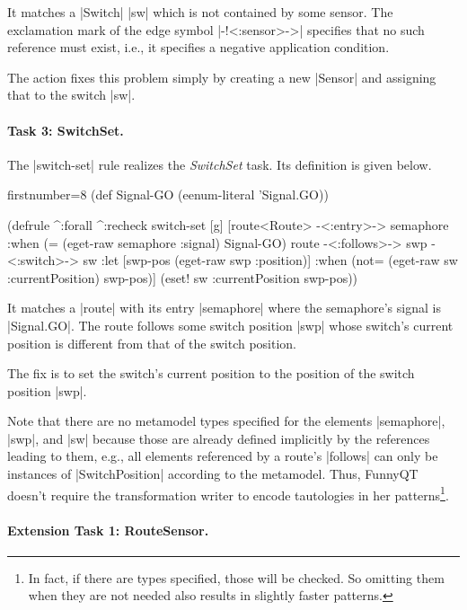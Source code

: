 \documentclass[submission]{eptcs}
\newcommand{\code}{\clojureinline}
\begin{document}
It matches a \code|Switch| \code|sw| which is not contained by some sensor.
The exclamation mark of the edge symbol \code|-!<:sensor>->| specifies that no
such reference must exist, i.e., it specifies a negative application condition.

The action fixes this problem simply by creating a new \code|Sensor| and
assigning that to the switch \code|sw|.


\paragraph{Task 3: SwitchSet.}

The \code|switch-set| rule realizes the \emph{SwitchSet} task.  Its definition
is given below.

\begin{clojurecode*}{firstnumber=8}
(def Signal-GO (eenum-literal 'Signal.GO))

(defrule ^:forall ^:recheck switch-set [g]
  [route<Route> -<:entry>-> semaphore
   :when (= (eget-raw semaphore :signal) Signal-GO)
   route -<:follows>-> swp -<:switch>-> sw
   :let [swp-pos (eget-raw swp :position)]
   :when (not= (eget-raw sw :currentPosition) swp-pos)]
  (eset! sw :currentPosition swp-pos))
\end{clojurecode*}

It matches a \code|route| with its entry \code|semaphore| where the semaphore's
signal is \code|Signal.GO|.  The route follows some switch position \code|swp|
whose switch's current position is different from that of the switch position.

The fix is to set the switch's current position to the position of the switch
position \code|swp|.

Note that there are no metamodel types specified for the elements
\code|semaphore|, \code|swp|, and \code|sw| because those are already defined
implicitly by the references leading to them, e.g., all elements referenced by
a route's \code|follows| can only be instances of \code|SwitchPosition|
according to the metamodel.  Thus, FunnyQT doesn't require the transformation
writer to encode tautologies in her patterns\footnote{In fact, if there are
  types specified, those will be checked.  So omitting them when they are not
  needed also results in slightly faster patterns.}.


\paragraph{Extension Task 1: RouteSensor.}
\end{document}
